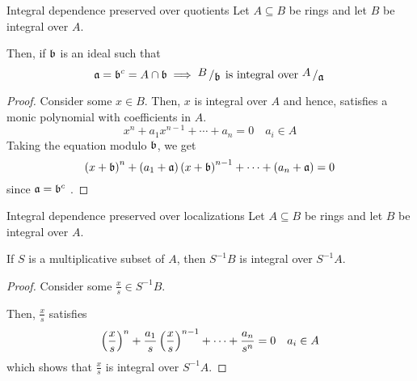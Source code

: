 \begin{proposition}{Integral dependence preserved over quotients}{}
\label{prop:5.6.1}
	Let \(A \subseteq B\) be rings and let \(B\) be integral over \(A\).

	Then, if \(\mathfrak{b}\) is an ideal such that
	\[
		\mfa = \mfb^c = A \cap \mfb \implies \bigslant{B}{\mfb}
		\text{ is integral over } \bigslant{A}{\mfa}
	\]
\end{proposition}
\begin{proof}
	Consider some \(x \in B\).
	Then, \(x\) is integral over \(A\) and hence, satisfies a monic
	polynomial with coefficients in \(A\).
	\[
		x^n + a_1 x^{n-1} + \cdots + a_n = 0 \quad a_i \in A
	\]
	Taking the equation modulo \(\mathfrak{b}\), we get
	\[
		\left( x + \mathfrak{b} \right)^n + \left( a_1 + \mathfrak{a} \right) \left( x + \mathfrak{b} \right)^{n-1}
		+ \cdots + \left( a_n + \mathfrak{a} \right) = 0
	\]
	since \(\mathfrak{a} = \mathfrak{b}^c\) .
\end{proof}


\begin{proposition}{Integral dependence preserved over localizations}{}
\label{prop:5.6.2}
	Let \(A \subseteq B\) be rings and let \(B\) be integral over \(A\).

	If \(S\) is a multiplicative subset of \(A\), then
	\(S^{-1} B\) is integral over \(S^{-1} A\).
\end{proposition}
\begin{proof}
	Consider some \(\frac{x}{s} \in S^{-1} B\).

	Then, \(\frac{x}{s}\) satisfies
	\[
		\left( \frac{x}{s} \right)^n + \frac{a_1}{s} \left( \frac{x}{s} \right)^{n-1}
		+ \cdots + \frac{a_n}{s^n} = 0 \quad a_i \in A
	\]
	which shows that \(\frac{x}{s}\) is integral over \(S^{-1} A\).
\end{proof}


\pagebreak


